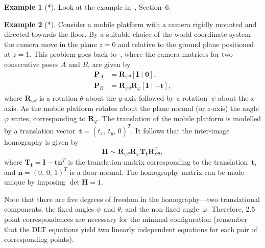\documentclass[11pt,a4paper]{article}
\theoremstyle{definition}
\newtheorem{example}{Example}
\renewcommand{\phi}{\varphi}
\newcommand{\T}{T}
\newcommand{\mat}[1]{\bm{#1}}
\begin{document}
\begin{example}[*]
Look at the example in~\cite{larsson2017cvpr}, Section~6.
\end{example}

\begin{example}[*]\label{ex:Hplanar1}
Consider a mobile platform with a camera rigidly mounted and directed towards the floor.
By a suitable choice of the
world coordinate system the camera move in the plane $z=0$ and relative to the ground plane
positioned at $z=1$. This problem goes back to~\cite{wadenback2013},
where the camera matrices for two consecutive
poses $A$ and $B$, are given by
\begin{equation}\label{paper03:eq:cammats}
\begin{aligned}
    \mat{P}_A &= \mat{R}_{\psi\theta}[\mat{I}\;|\;\mat{0}],\\
    \mat{P}_B &= \mat{R}_{\psi\theta}\mat{R}_\phi[\mat{I}\;|\;{-\mat{t}}],
\end{aligned}
\end{equation}
where $\mat{R}_{\psi\theta}$ is a rotation $\theta$ about the $y$-axis followed by
a rotation~$\psi$ about the $x$-axis. As the mobile platform rotates about the
plane normal (or $z$-axis) the angle $\phi$ varies, corresponding to $\mat{R}_\phi$.
The translation of the mobile platform is modelled by a translation vector~$\mat{t}=(t_x,\,t_y,\,0)^{\T}$.
It follows that the inter-image homography is given by
\begin{equation}\label{eq:Hplanar}
    \mat{H} \sim \mat{R}_{\psi\theta}\mat{R}_{\phi}\mat{T}_{\mat{t}}\mat{R}_{\psi\theta}^{\T},
\end{equation}
where $\mat{T}_{\mat{t}}=\mat{I}-\mat{tn}^{\T}$ is the translation matrix corresponding
to the translation~$\mat{t}$, and $\mat{n}=(0,\,0,\,1)^{\T}$ is a floor normal.
The homography matrix can be made unique by imposing $\det{\mat{H}}=1$.

Note that there are five degrees of freedom in the homography---two translational components,
the fixed angles $\psi$ and $\theta$, and the non-fixed angle~$\phi$. Therefore, 2.5-point
correspondences are necessary for the minimal configuration (remember that the DLT equations yield
two linearly independent equations for each pair of corresponding points).


\end{example}
\end{document}
